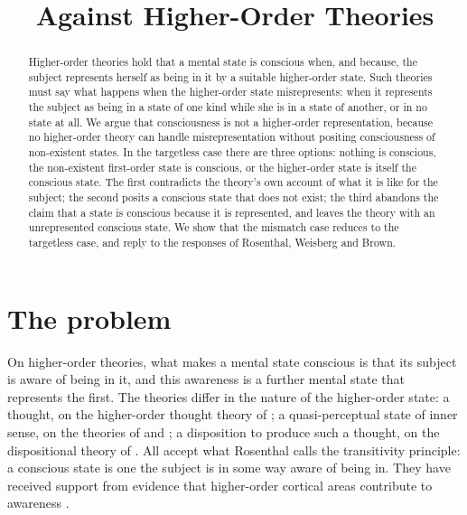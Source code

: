 \documentclass{situationist-preprint}
\title{Against Higher-Order Theories}
\begin{document}
\maketitle

\begin{abstract}
Higher-order theories hold that a mental state is conscious when, and because, the subject represents herself as being in it by a suitable higher-order state. Such theories must say what happens when the higher-order state misrepresents: when it represents the subject as being in a state of one kind while she is in a state of another, or in no state at all. We argue that consciousness is not a higher-order representation, because no higher-order theory can handle misrepresentation without positing consciousness of non-existent states. In the targetless case there are three options: nothing is conscious, the non-existent first-order state is conscious, or the higher-order state is itself the conscious state. The first contradicts the theory's own account of what it is like for the subject; the second posits a conscious state that does not exist; the third abandons the claim that a state is conscious because it is represented, and leaves the theory with an unrepresented conscious state. We show that the mismatch case reduces to the targetless case, and reply to the responses of Rosenthal, Weisberg and Brown.
\end{abstract}

\section{The problem}

On higher-order theories, what makes a mental state conscious is that its subject is aware of being in it, and this awareness is a further mental state that represents the first. The theories differ in the nature of the higher-order state: a thought, on the higher-order thought theory of \citet{Rosenthal2005}; a quasi-perceptual state of inner sense, on the theories of \citet{Armstrong1968} and \citet{Lycan1996}; a disposition to produce such a thought, on the dispositional theory of \citet{Carruthers2000}. All accept what Rosenthal calls the transitivity principle: a conscious state is one the subject is in some way aware of being in. They have received support from evidence that higher-order cortical areas contribute to awareness \citep{LauRosenthal2011}.
\end{document}
